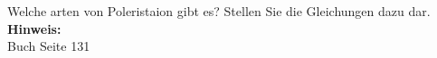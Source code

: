 \begin{question}[section=5,subsection=52,name={Poleristaion von Wellen 2},difficulty=7,type=mdl,mode=exm,tags={}]
	Welche arten von Poleristaion gibt es? Stellen Sie die Gleichungen dazu dar.
	\\ \textbf{Hinweis:}\\
	Buch Seite 131
\end{question}
\begin{solution}
	
\end{solution}